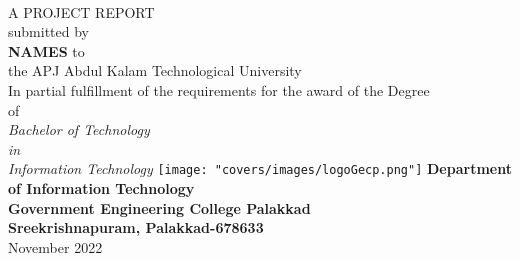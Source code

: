 \begin{titlepage}
  \begin{center}
    \textbf{\cTitle}\\
    \vfill
    A PROJECT REPORT\\
    \vfill
    submitted by\\
    \vfill
    \textbf{
        NAMES
    }
    \vfill
    to\\
    the APJ Abdul Kalam Technological University\\
    \vfill
    In partial fulfillment of the requirements for the award of the Degree\\
    of\\
    \emph{
        Bachelor of Technology\\
        in\\
        Information Technology
    }
    \vfill
    \texttt{[image: "covers/images/logoGecp.png"]}
    \vfill
    \textbf{Department of Information Technology\\
      Government Engineering College Palakkad\\
      Sreekrishnapuram, Palakkad-678633}\\
    November 2022
  \end{center}
\end{titlepage}